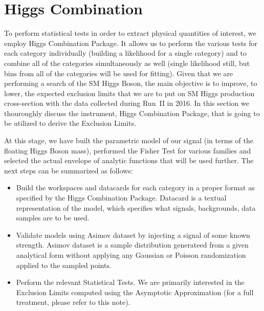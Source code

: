 \section{Higgs Combination} \label{section:higgs_combination}
To perform statistical tests in order to extract physical quantities of interest, we employ Higgs Combination Package\cite{}. It allows us to perform the various tests for each category individually (building a likelihood for a single category) and to combine all of the categories simultaneously as well (single likelihood still, but bins from all of the categories will be used for fitting). Given that we are performing a search of the SM Higgs Boson, the main objective is to improve, to lower, the expected exclusion limits that we are to put on SM Higgs production cross-section with the data collected during Run~II in 2016. In this section we thouroughly discuss the instrument, Higgs Combination Package, that is going to be utilized to derive the Exclusion Limits.

At this stage, we have built the parametric model of our signal (in terms of the floating Higgs Boson mass), performed the Fisher Test for various families and selected the actual envelope of analytic functions that will be used further. The next steps can be summarized as follows:
\begin{itemize}
    \item Build the workspaces and datacards for each category in a proper format as specified by the Higgs Combination Package. Datacard is a textual representation of the model, which specifies what signals, backgrounds, data samples are to be used.
    \item Validate models using Asimov dataset by injecting a signal of some known strength. Asimov dataset is a sample distribution generateed from a given analytical form without applying any Gaussian or Poisson randomization applied to the sampled points.
    \item Perform the relevant Statistical Tests. We are primarily interested in the Exclusion Limits computed using the Asymptotic Approximation (for a full treatment, please refer to this note\cite{}).
\end{itemize}


